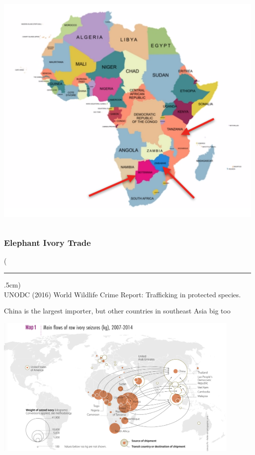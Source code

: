 \documentclass[10pt]{beamer}
\newenvironment{reference}[2]{%
	\begin{textblock*}{\textwidth}(#1,#2)
		\tiny\bgroup\color{gray}}{\egroup\end{textblock*}}
\begin{document}
\begin{frame}[t]
\begin{columns}
		\begin{column}{0.5\textwidth}
			\begin{center}
				\includegraphics[width=1.1\textwidth]{figures/eCountries2.png}	
			\end{center}
		\end{column}
	\end{columns}	
\end{frame}


\begin{frame}[t]
\frametitle{Elephant Ivory Trade}
\vspace{0.5cm}

	\begin{reference}{4mm}{92mm}
		\rule{1.5cm}{0.25pt}\\
		UNODC (2016) World Wildlife Crime Report: Trafficking in protected species.
	\end{reference}
	
	China is the largest importer, but other countries in southeast Asia big too\\
	
	\vspace{0.25cm}
	
	\begin{center}
		\includegraphics[width=0.9\textwidth]{figures/map2.png}
	\end{center}
\end{frame}
\end{document}
